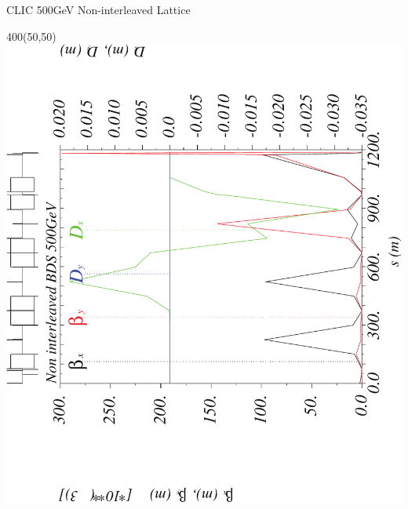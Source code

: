 \documentclass{beamer}
\begin{document}
\begin{frame}{CLIC 500GeV Non-interleaved Lattice}
  \setlength{\TPHorizModule}{1pt}
  \setlength{\TPVertModule}{1pt}
 \begin{textblock}{400}(50,50)
 \includegraphics[scale=0.4,angle=-90]{CLIC500noninter_etax-crop.pdf}
 \end{textblock}
\end{frame}
\end{document}
